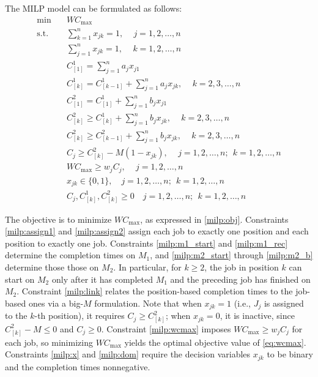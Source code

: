 ﻿\documentclass[12pt]{article}
\begin{document}
\begin{sloppypar}
The MILP model can be formulated as follows:
\begin{align}
\min \quad & W C_{\max} \label{milp:obj} \\
            \text{s.t.} \quad & \sum_{k=1}^{n} x_{jk} = 1, \quad \, j = 1, 2,\dots, n \label{milp:assign1} \\
            & \sum_{j=1}^{n} x_{jk} = 1, \quad \, k = 1, 2, \ldots,n \label{milp:assign2} \\
            & C_{[1]}^1 = \sum_{j=1}^{n} a_j x_{j1} \label{milp:m1_start} \\
            & C_{[k]}^1 = C_{[k-1]}^1 + \sum_{j=1}^{n} a_j x_{jk}, \quad \, k = 2, 3, \ldots, n \label{milp:m1_rec} \\
            & C_{[1]}^2 = C_{[1]}^1 + \sum_{j=1}^{n} b_j x_{j1} \label{milp:m2_start} \\
            & C_{[k]}^2 \geq C_{[k]}^1 + \sum_{j=1}^{n} b_j x_{jk}, \quad \, k = 2, 3, \ldots, n \label{milp:m2_a} \\
            & C_{[k]}^2 \geq C_{[k-1]}^2 + \sum_{j=1}^{n} b_j x_{jk}, \quad \, k = 2, 3, \ldots, n \label{milp:m2_b} \\
            & C_j \geq C_{[k]}^2 - M(1 - x_{jk}), \quad \, j = 1, 2, \ldots, n; ~~ k = 1, 2, \ldots, n \label{milp:link} \\
            & W C_{\max} \geq w_j C_j, \quad \, j = 1, 2, \ldots,n \label{milp:wcmax} \\
            & x_{jk} \in \{0, 1\},\quad j=1, 2, \ldots, n; ~~ k=1, 2, \ldots, n \label{milp:x}\\
            & C_j, C_{[k]}^1, C_{[k]}^2 \geq 0 \quad j=1, 2, \ldots, n; ~~ k=1, 2, \ldots, n \label{milp:dom}
        \end{align}
        
        The objective is to minimize $W C_{\max}$, as expressed in \cref{milp:obj}. Constraints \cref{milp:assign1} and \cref{milp:assign2} assign each job to exactly one position and each position to exactly one job. Constraints \cref{milp:m1_start} and \cref{milp:m1_rec} determine the completion times on $M_1$, and \cref{milp:m2_start} through \cref{milp:m2_b} determine those those on $M_2$. In particular, for $k \geq 2$, the job in position $k$ can start on $M_2$ only after it has completed $M_1$ and the preceding job has finished on $M_2$. Constraint \cref{milp:link} relates the position-based completion times to the job-based ones via a big-$M$ formulation. Note that when $x_{jk} = 1$ (i.e., $J_j$ is assigned to the $k$-th position), it requires $C_j \geq C_{[k]}^2$; when $x_{jk} = 0$, it is inactive, since $C_{[k]}^2 - M \leq 0$ and $C_j \geq 0$. Constraint \cref{milp:wcmax} imposes  $W C_{\max} \geq w_j C_j$ for each job, so minimizing $W C_{\max}$ yields the optimal objective value of \cref{eq:wcmax}. Constraints \cref{milp:x} and \cref{milp:dom} require the decision variables $x_{jk}$ to be binary and the completion times nonnegative.
        


\end{sloppypar}
\end{document}
